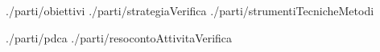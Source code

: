 \documentclass[a4paper,12pt]{article}
\title{\titoloDoc}
\newcommand{\parti}{./parti/}
\newcommand{\temp}{../../Template/}
\begin{document}
	\newpage
	\newpage
	\tableofcontents %
	\newpage
	\listoffigures
	\listoftables
	\newpage
	\newpage
	
	\newpage
	 {\parti obiettivi}
	\newpage
	 {\parti strategiaVerifica}
	\newpage
	 {\parti strumentiTecnicheMetodi}
	
	\begin{appendices}
		\newpage
		 {\parti pdca}
		\newpage
		 {\parti resocontoAttivitaVerifica}
		\newpage
		
	\end{appendices}
\end{document}
